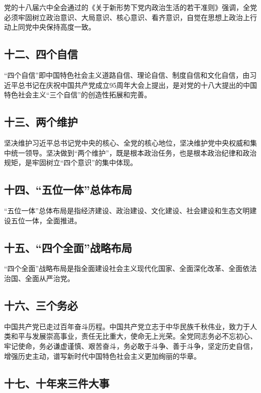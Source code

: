 \documentclass[UTF8,11pt,a4paper]{ctexart}
\begin{document}
党的十八届六中全会通过的《关于新形势下党内政治生活的若干准则》强调，全党必须牢固树立政治意识、大局意识、核心意识、看齐意识，自觉在思想上政治上行动上同党中央保持高度一致。

\subsection*{十二、四个自信}

“四个自信”即中国特色社会主义道路自信、理论自信、制度自信和文化自信，由习近平总书记在庆祝中国共产党成立95周年大会上提出，是对党的十八大提出的中国特色社会主义“三个自信”的创造性拓展和完善。

\subsection*{十三、两个维护}

坚决维护习近平总书记党中央的核心、全党的核心地位，坚决维护党中央权威和集中统一领导。坚决做到“两个维护”，既是根本政治任务，也是根本政治纪律和政治规矩，是牢固树立“四个意识”的集中体现。

\subsection*{十四、“五位一体”总体布局}

“五位一体”总体布局是指经济建设、政治建设、文化建设、社会建设和生态文明建设五位一体，全面推进。

\subsection*{十五、“四个全面”战略布局}

“四个全面”战略布局是指全面建设社会主义现代化国家、全面深化改革、全面依法治国、全面从严治党。

\subsection*{十六、三个务必}

中国共产党已走过百年奋斗历程。中国共产党立志于中华民族千秋伟业，致力于人类和平与发展崇高事业，责任无比重大，使命无上光荣。全党同志务必不忘初心、牢记使命，务必谦虚谨慎、艰苦奋斗，务必敢于斗争、善于斗争，坚定历史自信，增强历史主动，谱写新时代中国特色社会主义更加绚丽的华章。

\subsection*{十七、十年来三件大事}
\end{document}
